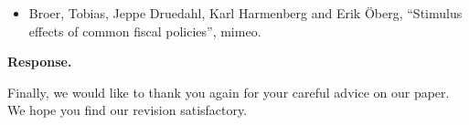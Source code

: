 \documentclass[12pt,letterpaper,english]{article}
\begin{document}
	\begin{itemize}
		\item Broer, Tobias, Jeppe Druedahl, Karl Harmenberg and Erik \"Oberg, ``Stimulus effects of common fiscal policies'', mimeo. 
	\end{itemize}

	\noindent \textbf{Response.} 

\bigskip

\noindent Finally, we would like to thank you again for your careful advice on our paper. We hope you find our revision satisfactory.



\end{document}

